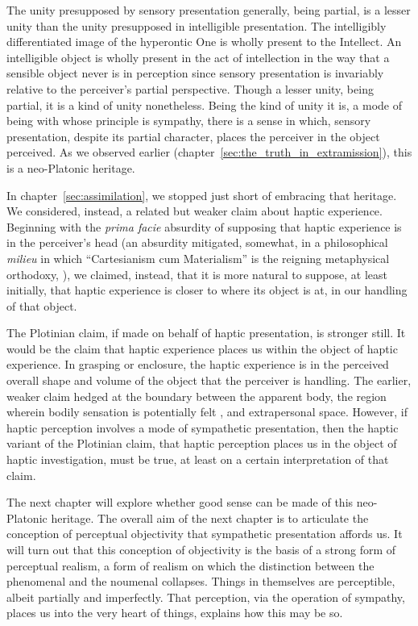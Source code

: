 The unity presupposed by sensory presentation generally, being partial, is a lesser unity than the unity presupposed in intelligible presentation. The intelligibly differentiated image of the hyperontic One is wholly present to the Intellect. An intelligible object is wholly present in the act of intellection in the way that a sensible object never is in perception since sensory presentation is invariably relative to the perceiver's partial perspective. Though a lesser unity, being partial, it is a kind of unity nonetheless. Being the kind of unity it is, a mode of being with whose principle is sympathy, there is a sense in which, sensory presentation, despite its partial character, places the perceiver in the object perceived. As we observed earlier (chapter~\ref{sec:the_truth_in_extramission}), this is a neo-Platonic heritage. 

In chapter~\ref{sec:assimilation}, we stopped just short of embracing that heritage. We considered, instead, a related but weaker claim about haptic experience. Beginning with the \emph{prima facie} absurdity of supposing that haptic experience is in the perceiver's head (an absurdity mitigated, somewhat, in a philosophical \emph{milieu} in which ``Cartesianism cum Materialism'' is the reigning metaphysical orthodoxy, \citealt{Putnam:1993kx,Putnam:1994kx,Putnam:1999eu}), we claimed, instead, that it is more natural to suppose, at least initially, that haptic experience is closer to where its object is at, in our handling of that object. 

The Plotinian claim, if made on behalf of haptic presentation, is stronger still. It would be the claim that haptic experience places us within the object of haptic experience. In grasping or enclosure, the haptic experience is in the perceived overall shape and volume of the object that the perceiver is handling. The earlier, weaker claim hedged at the boundary between the apparent body, the region wherein bodily sensation is potentially felt \citep{Martin:1992aa}, and extrapersonal space. However, if haptic perception involves a mode of sympathetic presentation, then the haptic variant of the Plotinian claim, that haptic perception places us in the object of haptic investigation, must be true, at least on a certain interpretation of that claim. 

The next chapter will explore whether good sense can be made of this neo-Platonic heritage. The overall aim of the next chapter is to articulate the conception of perceptual objectivity that sympathetic presentation affords us. It will turn out that this conception of objectivity is the basis of a strong form of perceptual realism, a form of realism on which the distinction between the phenomenal and the noumenal collapses. Things in themselves are perceptible, albeit partially and imperfectly. That perception, via the operation of sympathy, places us into the very heart of things, explains how this may be so.





